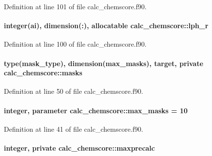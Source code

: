 Definition at line 101 of file calc\-\_\-chemscore.\-f90.

\hypertarget{classcalc__chemscore_ab1e216a48152826de41fffb5a9d2d48e}{
\paragraph[{lph\-\_\-r}]{\setlength{\rightskip}{0pt plus 5cm}integer(ai), dimension(\-:), allocatable calc\-\_\-chemscore\-::lph\-\_\-r}}\label{classcalc__chemscore_ab1e216a48152826de41fffb5a9d2d48e}


Definition at line 100 of file calc\-\_\-chemscore.\-f90.

\hypertarget{classcalc__chemscore_ae95a0840a35137beed3bcc7ff4345626}{
\paragraph[{masks}]{\setlength{\rightskip}{0pt plus 5cm}type(mask\-\_\-type), dimension({\bf max\-\_\-masks}), target, private calc\-\_\-chemscore\-::masks\hspace{0.3cm}{\ttfamily [private]}}}\label{classcalc__chemscore_ae95a0840a35137beed3bcc7ff4345626}


Definition at line 50 of file calc\-\_\-chemscore.\-f90.

\hypertarget{classcalc__chemscore_a035d2a19bada1d6c65c8ac2d7574c263}{
\paragraph[{max\-\_\-masks}]{\setlength{\rightskip}{0pt plus 5cm}integer, parameter calc\-\_\-chemscore\-::max\-\_\-masks = 10}}\label{classcalc__chemscore_a035d2a19bada1d6c65c8ac2d7574c263}


Definition at line 41 of file calc\-\_\-chemscore.\-f90.

\hypertarget{classcalc__chemscore_a5bff437603dc25b9d5bd6537a8039f2d}{
\paragraph[{maxprecalc}]{\setlength{\rightskip}{0pt plus 5cm}integer, private calc\-\_\-chemscore\-::maxprecalc\hspace{0.3cm}{\ttfamily [private]}}}\label{classcalc__chemscore_a5bff437603dc25b9d5bd6537a8039f2d}


